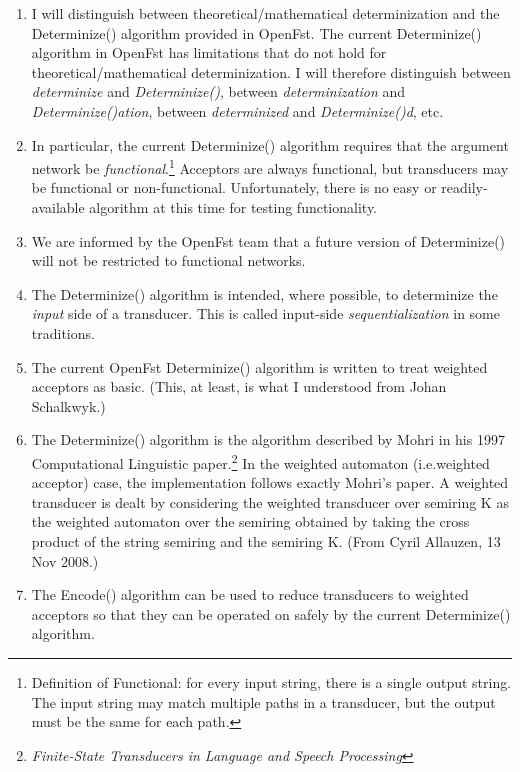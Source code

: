 \documentclass[letterpaper,12pt]{article}
\begin{document}
\begin{enumerate}

\item
I will distinguish between theoretical/mathematical determinization
and the Determinize() algorithm provided in OpenFst.  The current Determinize()
algorithm in OpenFst has limitations that do not hold for
theoretical/mathe\-matical
determinization.  I will therefore distinguish between
\emph{determinize} and
\emph{Determinize()}, between \emph{determinization} and
\emph{Determinize()ation}, between \emph{determinized}
and \emph{Determinize()d}, etc.

\item
In particular, the current Determinize() algorithm requires that the argument network be
\emph{functional}.\footnote{Definition of Functional: for every input string, there is a single output
string.  The input string may match multiple paths in a transducer, but the output
must be the same for each path.}  Acceptors are always functional,
but transducers may be functional or non-functional.
Unfortunately, there is no easy or readily-available algorithm at
this time for testing functionality.

\item
We are informed by the OpenFst team that a future version of Determinize()
will not be restricted to functional networks.

\item
The Determinize() algorithm is intended, where possible, to determinize the 
\emph{input}
side of a transducer.  This is called input-side \emph{sequentialization} in some traditions.

\item
The current OpenFst Determinize() algorithm is written to treat weighted acceptors as basic.  (This, at least, is
what I understood from Johan Schalkwyk.)  

\item
The Determinize() algorithm is the  
algorithm described by Mohri in his 1997 Computational Linguistic
paper.\footnote{\emph{Finite-State Transducers in Language and Speech Processing}}
In the weighted automaton (i.e.\@ weighted acceptor) case, the implementation follows exactly  
Mohri's paper. A weighted transducer is dealt by considering the
weighted transducer over semiring K as the weighted automaton over the  
semiring obtained by taking the cross product of the string semiring  
and the semiring K. (From Cyril Allauzen, 13 Nov 2008.)

\item
The Encode() algorithm can be used to reduce transducers to
weighted acceptors so that they can be operated on safely by the
current Determinize() algorithm.


\end{enumerate}
\end{document}
